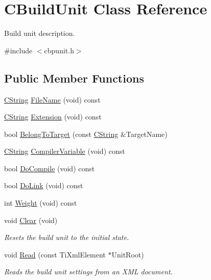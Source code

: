 \hypertarget{classCBuildUnit}{\section{C\-Build\-Unit Class Reference}
\label{classCBuildUnit}
}


Build unit description.  




{\ttfamily \#include $<$cbpunit.\-h$>$}

\subsection*{Public Member Functions}
\begin{DoxyCompactItemize}
\item 
\hyperlink{classCString}{C\-String} \hyperlink{classCBuildUnit_ad40cf7352f45a27e57b6311beb6bee6d}{File\-Name} (void) const 
\item 
\hyperlink{classCString}{C\-String} \hyperlink{classCBuildUnit_aacd2162b069fc68029b717e4d12ed690}{Extension} (void) const 
\item 
bool \hyperlink{classCBuildUnit_af6f2482ae13eb001c0c5b1b521ee51a5}{Belong\-To\-Target} (const \hyperlink{classCString}{C\-String} \&Target\-Name)
\item 
\hyperlink{classCString}{C\-String} \hyperlink{classCBuildUnit_a860f41c4576f41923dface8ca6400644}{Compiler\-Variable} (void) const 
\item 
bool \hyperlink{classCBuildUnit_aff6100868bde918ae36b6b8f66ac236b}{Do\-Compile} (void) const 
\item 
bool \hyperlink{classCBuildUnit_a6dafdc5ad265275d0df4a7d4925475b5}{Do\-Link} (void) const 
\item 
int \hyperlink{classCBuildUnit_a9f7b7b1b89b965c0e373af6b24b49a4d}{Weight} (void) const 
\item 
void \hyperlink{classCBuildUnit_a1823fada9ce022e1fcc10b4cda7d1c78}{Clear} (void)
\begin{DoxyCompactList}\small\item\em Resets the build unit to the initial state. \end{DoxyCompactList}\item 
void \hyperlink{classCBuildUnit_a5f6525727bea04483400925baf4c09c9}{Read} (const Ti\-Xml\-Element $\ast$Unit\-Root)
\begin{DoxyCompactList}\small\item\em Reads the build unit settings from an X\-M\-L document. \end{DoxyCompactList}\item 

\end{DoxyCompactItemize}
